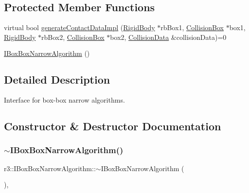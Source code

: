 \subsection*{Protected Member Functions}
\begin{DoxyCompactItemize}
\item 
virtual bool \mbox{\hyperlink{classr3_1_1_i_box_box_narrow_algorithm_abc15898100b5ed0537e4c6ccc6610069}{generate\+Contact\+Data\+Impl}} (\mbox{\hyperlink{classr3_1_1_rigid_body}{Rigid\+Body}} $\ast$rb\+Box1, \mbox{\hyperlink{classr3_1_1_collision_box}{Collision\+Box}} $\ast$box1, \mbox{\hyperlink{classr3_1_1_rigid_body}{Rigid\+Body}} $\ast$rb\+Box2, \mbox{\hyperlink{classr3_1_1_collision_box}{Collision\+Box}} $\ast$box2, \mbox{\hyperlink{classr3_1_1_collision_data}{Collision\+Data}} \&collision\+Data)=0
\item 
\mbox{\hyperlink{classr3_1_1_i_box_box_narrow_algorithm_a9e01be1ba6e1bbd925fca03f36f06752}{I\+Box\+Box\+Narrow\+Algorithm}} ()
\end{DoxyCompactItemize}


\subsection{Detailed Description}
Interface for box-\/box narrow algorithms. 

\subsection{Constructor \& Destructor Documentation}
\mbox{\label{classr3_1_1_i_box_box_narrow_algorithm_a384c60f79ed845100877e62d7e2a10f4}} 
\subsubsection{\texorpdfstring{$\sim$\+I\+Box\+Box\+Narrow\+Algorithm()}{~IBoxBoxNarrowAlgorithm()}}
{\footnotesize\ttfamily r3\+::\+I\+Box\+Box\+Narrow\+Algorithm\+::$\sim$\+I\+Box\+Box\+Narrow\+Algorithm (\begin{DoxyParamCaption}{ }\end{DoxyParamCaption})\hspace{0.3cm}{\ttfamily [virtual]}, {\ttfamily [default]}}

